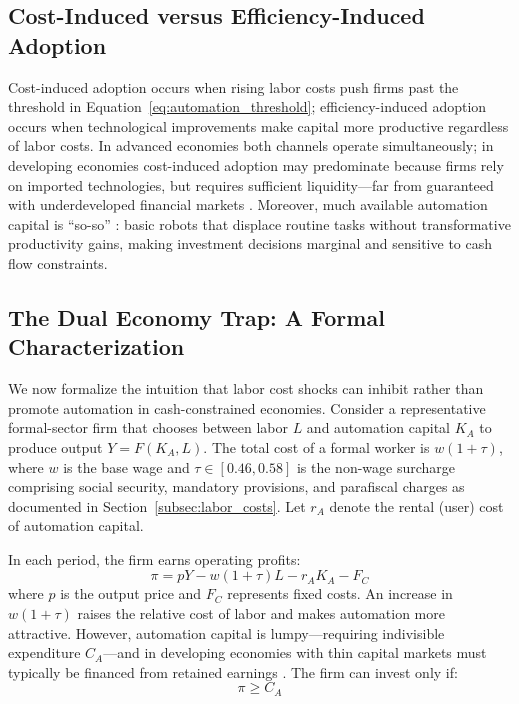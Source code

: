 \documentclass[5p,times,authoryear]{elsarticle}
\begin{document}
\subsection{Cost-Induced versus Efficiency-Induced Adoption}
\label{subsec:cost_vs_efficiency}

Cost-induced adoption occurs when rising labor costs push firms past the threshold in Equation~\ref{eq:automation_threshold}; efficiency-induced adoption occurs when technological improvements make capital more productive regardless of labor costs. In advanced economies both channels operate simultaneously; in developing economies cost-induced adoption may predominate because firms rely on imported technologies, but requires sufficient liquidity---far from guaranteed with underdeveloped financial markets \citep{busso2020}. Moreover, much available automation capital is ``so-so'' \citep{acemoglu2020taxes}: basic robots that displace routine tasks without transformative productivity gains, making investment decisions marginal and sensitive to cash flow constraints.

\subsection{The Dual Economy Trap: A Formal Characterization}
\label{subsec:formal_trap}

We now formalize the intuition that labor cost shocks can inhibit rather than promote automation in cash-constrained economies. Consider a representative formal-sector firm that chooses between labor $L$ and automation capital $K_A$ to produce output $Y = F(K_A, L)$. The total cost of a formal worker is $w(1 + \tau)$, where $w$ is the base wage and $\tau \in [0.46, 0.58]$ is the non-wage surcharge comprising social security, mandatory provisions, and parafiscal charges as documented in Section~\ref{subsec:labor_costs}. Let $r_A$ denote the rental (user) cost of automation capital.

In each period, the firm earns operating profits:
\begin{equation}
\label{eq:profits}
\pi = pY - w(1+\tau)L - r_A K_A - F_C
\end{equation}
where $p$ is the output price and $F_C$ represents fixed costs. An increase in $w(1+\tau)$ raises the relative cost of labor and makes automation more attractive. However, automation capital is lumpy---requiring indivisible expenditure $C_A$---and in developing economies with thin capital markets must typically be financed from retained earnings \citep{busso2020}. The firm can invest only if:
\begin{equation}
\label{eq:finance_constraint}
\pi \geq C_A
\end{equation}
\end{document}
